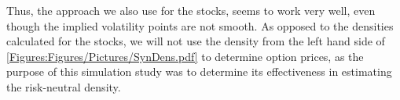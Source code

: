 
Thus, the approach we also use for the stocks, seems to work very well, even though the implied volatility points are not smooth. As opposed to the densities calculated for the stocks, we will not use the density from the left hand side of \autoref{Figures:Figures/Pictures/SynDens.pdf} to determine option prices, as the purpose of this simulation study was to determine its effectiveness in estimating the risk-neutral density.


